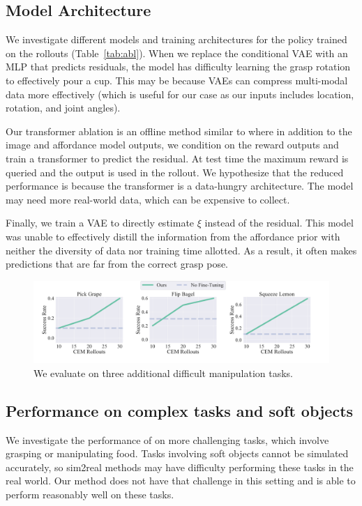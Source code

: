 \subsection{Model Architecture} We investigate different models and training architectures for the policy trained on the rollouts (Table~\ref{tab:abl}). When we replace the conditional VAE with an MLP that predicts residuals, the model has difficulty learning the grasp rotation to effectively pour a cup. This may be because VAEs can compress multi-modal data more effectively (which is useful for our case as our inputs includes location, rotation, and joint angles).

Our transformer ablation is an offline method similar to \cite{chen2021decisiontransformer} where in addition to the image and affordance model outputs, we condition on the reward outputs and train a transformer to predict the residual. At test time the maximum reward is queried and the output is used in the rollout. We hypothesize that the reduced performance is because the transformer is a data-hungry architecture. The model may need more real-world data, which can be expensive to collect.

Finally, we train a VAE to directly estimate $\xi$ instead of the residual. This model was unable to effectively distill the information from the affordance prior with neither the diversity of data nor training time allotted. As a result, it often makes predictions that are far from the correct grasp pose. 


\begin{figure}[t]
\vspace{-0.2in}
\begin{center}
    \includegraphics[width=\linewidth]{figs/graphs_difficult.pdf}
\end{center}
\vspace{-0.1in}
  \caption{\small We evaluate \ours on three additional difficult manipulation tasks. }
 \label{fig:graph_difficult}
 \vspace{-0.15in}
\end{figure}


\subsection{Performance on complex tasks and soft objects} 
We investigate the performance of \ours on more challenging tasks, which involve grasping or manipulating food. Tasks involving soft objects cannot be simulated accurately, so sim2real methods may have difficulty performing these tasks in the real world. Our method does not have that challenge in this setting and \ours is able to perform reasonably well on these tasks.

